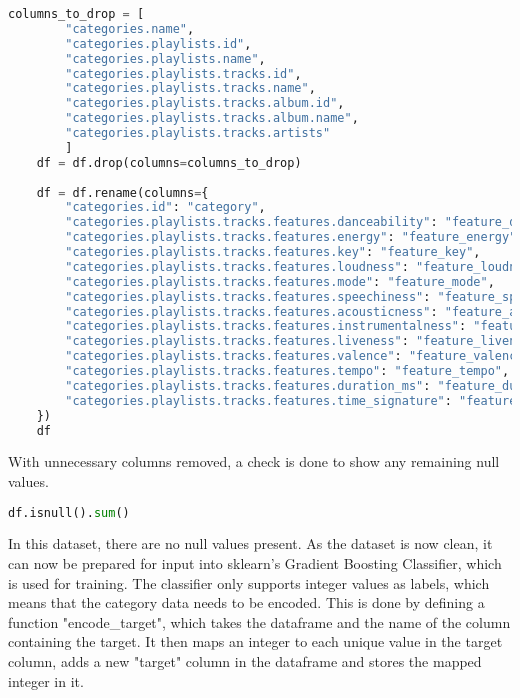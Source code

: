 \begin{lstlisting}[language=Python]
    columns_to_drop = [
        "categories.name",
        "categories.playlists.id",
        "categories.playlists.name",
        "categories.playlists.tracks.id",
        "categories.playlists.tracks.name",
        "categories.playlists.tracks.album.id",
        "categories.playlists.tracks.album.name",
        "categories.playlists.tracks.artists"
        ]
    df = df.drop(columns=columns_to_drop)
    
    df = df.rename(columns={
        "categories.id": "category",
        "categories.playlists.tracks.features.danceability": "feature_danceability",
        "categories.playlists.tracks.features.energy": "feature_energy",
        "categories.playlists.tracks.features.key": "feature_key",
        "categories.playlists.tracks.features.loudness": "feature_loudness",
        "categories.playlists.tracks.features.mode": "feature_mode",
        "categories.playlists.tracks.features.speechiness": "feature_speechiness",
        "categories.playlists.tracks.features.acousticness": "feature_acousticness",
        "categories.playlists.tracks.features.instrumentalness": "feature_instrumentalness",
        "categories.playlists.tracks.features.liveness": "feature_liveness",
        "categories.playlists.tracks.features.valence": "feature_valence",
        "categories.playlists.tracks.features.tempo": "feature_tempo",
        "categories.playlists.tracks.features.duration_ms": "feature_duration_ms",
        "categories.playlists.tracks.features.time_signature": "feature_time_signature"
    })
    df
\end{lstlisting}

With unnecessary columns removed, a check is done to show any remaining null values.

\begin{lstlisting}[language=Python]
    df.isnull().sum()
\end{lstlisting}

In this dataset, there are no null values present. As the dataset is now clean, it can now be prepared
for input into sklearn's Gradient Boosting Classifier, which is used for training.
The classifier only supports integer values as labels, which means that the category data needs to be encoded.
This is done by defining a function "encode\_target", which takes the dataframe and the name of the column containing
the target. It then maps an integer to each unique value in the target column, adds a new "target" column in the
dataframe and stores the mapped integer in it.


